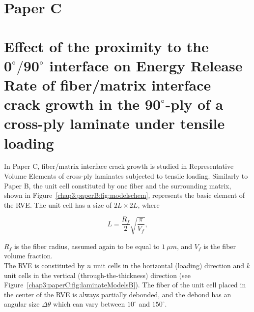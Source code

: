 \section{Paper C}\label{chap3:paperC}
\section*{Effect of the proximity to the $\mathbf{0^{\circ}/90^{\circ}}$ interface on Energy Release Rate of fiber/matrix interface crack growth in the  $\mathbf{90^{\circ}}$-ply of a cross-ply laminate under tensile loading}

In Paper C, fiber/matrix interface crack growth is studied in Representative Volume Elements of cross-ply laminates subjected to tensile loading. Similarly to Paper B, the unit cell constituted by one fiber and the surrounding matrix, shown in Figure~\ref{chap3:paperB:fig:modelschem}, represents the basic element of the RVE. The unit cell has a size of $2L\times2L$, where

\begin{equation}\label{chap3:paperC:eq:LVf}
L=\frac{R_{f}}{2}\sqrt{\frac{\pi}{V_{f}}},
\end{equation}

$R_{f}$ is the fiber radius, assumed again to be equal to $1\ \mu m$, and $V_{f}$ is the fiber volume fraction.\\
The RVE is constituted by $n$ unit cells in the horizontal (loading) direction and $k$ unit cells in the vertical (through-the-thickness) direction (see Figure~\ref{chap3:paperC:fig:laminateModelsB}). The fiber of the unit cell placed in the center of the RVE is always partially debonded, and the debond has an angular size $\Delta\theta$ which can vary between $10^{\circ}$ and $150^{\circ}$.

